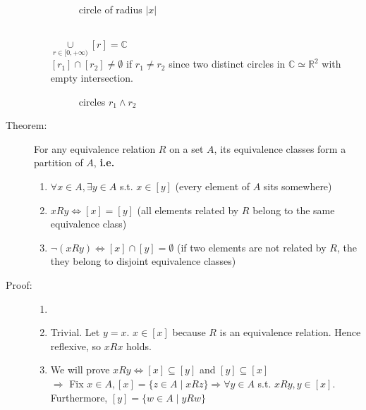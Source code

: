 \documentclass[10pt]{article}
\begin{document}
\begin{description}
\begin{enumerate}
			\begin{figure}[h]
				\centering
				\caption*{circle of radius $|x|$}
			\end{figure}
			\\
			$\underset{r \in [0, +\infty)}{\cup} [r] = \mathbb{C}$ \\
			$[r_1] \cap [r_2] \neq \emptyset$ if $r_1 \neq r_2$ since two distinct circles in $\mathbb{C} \simeq \mathbb{R}^2$ with empty intersection.
			\pagebreak
			\begin{figure}[h]
				\centering
				\caption*{circles $r_1 \land r_2$}
			\end{figure}
		\end{enumerate}
		\item[Theorem:] For any equivalence relation $R$ on a set $A$, its equivalence classes form a partition of $A$, \textbf{i.e.}
		\begin{enumerate}
			\item $\forall x \in A, \exists y \in A$ s.t. $x \in [y]$ (every element of $A$ sits somewhere)
			\item $xRy \Leftrightarrow [x]=[y]$ (all elements related by $R$ belong to the same equivalence class)
			\item $\lnot (xRy) \Leftrightarrow [x] \cap [y] = \emptyset$ (if two elements are not related by $R$, the they belong to disjoint equivalence classes)
		\end{enumerate}
		\item[Proof:]
		\begin{enumerate}
			\item[]
			\item Trivial. Let $y=x$. $x \in [x]$ because $R$ is an equivalence relation. Hence reflexive, so $xRx$ holds.
			\item We will prove $xRy \Leftrightarrow [x] \subseteq [y]$ and $[y] \subseteq [x]$ \\
			$\Rightarrow$ Fix $x \in A, [x] = \{z \in A \mid xRz \} \Rightarrow \forall y \in A$ s.t. $xRy, y \in [x]$. Furthermore, $[y] = \{w \in A \mid yRw \}$ \\

\end{enumerate}
\end{description}
\end{document}
